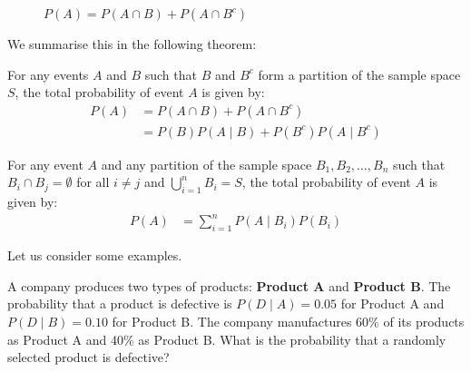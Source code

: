 \begin{figure}[htbp]
    \centering
        \caption{$P(A)=P(A \cap B)+P(A \cap B^c)$}
        \label{fig:decoA}
\end{figure}

We summarise this in the following theorem:

\begin{theorem}
For any events \( A \) and \( B \) such that \( B \) and \( B^c \) form a partition of the sample space \( S \), the total probability of event \( A \) is given by:
    \begin{align*}
    P(A) &= P(A \cap B) + P(A \cap B^c) \\
    &= P(B) P(A \mid B) + P(B^c) P(A \mid B^c)
    \end{align*}

    For any event \( A \) and any partition of the sample space \( B_1, B_2, \ldots, B_n \) such that \( B_i \cap B_j = \emptyset \) for all \( i \neq j \) and \( \bigcup_{i=1}^{n} B_i = S \), the total probability of event \( A \) is given by:
    \begin{align*}
    P(A) &= \sum_{i=1}^{n} P(A \mid B_i) P(B_i)
    \end{align*}
\end{theorem}

Let us consider some examples.

\begin{example}
    A company produces two types of products: \textbf{Product A} and \textbf{Product B}. The probability that a product is defective is \( P(D \mid A) = 0.05 \) for Product A and \( P(D \mid B) = 0.10 \) for Product B. The company manufactures 60\% of its products as Product A and 40\% as Product B. What is the probability that a randomly selected product is defective?
\end{example}

